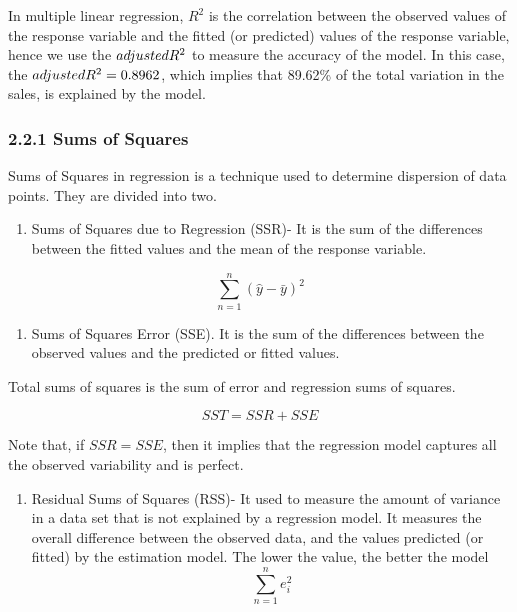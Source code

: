 \documentclass[
]{article}
\providecommand{\tightlist}{%
  \setlength{\itemsep}{0pt}\setlength{\parskip}{0pt}}
\begin{document}
In multiple linear regression, \(R^2\) is the correlation between the
observed values of the response variable and the fitted (or predicted)
values of the response variable, hence we use the \(adjusted\space R^2\)
to measure the accuracy of the model. In this case, the
\(adjusted\space R^2 =0.8962\), which implies that 89.62\% of the total
variation in the sales, is explained by the model.

\hypertarget{sums-of-squares}{%
\subsubsection{2.2.1 Sums of Squares}\label{sums-of-squares}}

Sums of Squares in regression is a technique used to determine
dispersion of data points. They are divided into two.

\begin{enumerate}
\def\labelenumi{\arabic{enumi}.}
\tightlist
\item
  Sums of Squares due to Regression (SSR)- It is the sum of the
  differences between the fitted values and the mean of the response
  variable.
\end{enumerate}

\[\sum_{n=1}^n(\hat{y}-\bar{y})^2\]

\begin{enumerate}
\def\labelenumi{\arabic{enumi}.}
\setcounter{enumi}{1}
\tightlist
\item
  Sums of Squares Error (SSE). It is the sum of the differences between
  the observed values and the predicted or fitted values.
\end{enumerate}

Total sums of squares is the sum of error and regression sums of
squares.

\[SST=SSR+SSE \]

Note that, if \(SSR=SSE\), then it implies that the regression model
captures all the observed variability and is perfect.

\begin{enumerate}
\def\labelenumi{\arabic{enumi}.}
\setcounter{enumi}{2}
\tightlist
\item
  Residual Sums of Squares (RSS)- It used to measure the amount of
  variance in a data set that is not explained by a regression model. It
  measures the overall difference between the observed data, and the
  values predicted (or fitted) by the estimation model. The lower the
  value, the better the model \[\sum_{n=1}^ne_i^2\]
\end{enumerate}
\end{document}

